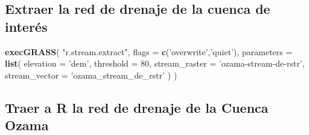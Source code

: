 \documentclass[11pt,]{article}
\newenvironment{Shaded}{\begin{snugshade}}{\end{snugshade}}
\newcommand{\KeywordTok}[1]{\textcolor[rgb]{0.13,0.29,0.53}{\textbf{#1}}}
\newcommand{\DataTypeTok}[1]{\textcolor[rgb]{0.13,0.29,0.53}{#1}}
\newcommand{\DecValTok}[1]{\textcolor[rgb]{0.00,0.00,0.81}{#1}}
\newcommand{\StringTok}[1]{\textcolor[rgb]{0.31,0.60,0.02}{#1}}
\newcommand{\NormalTok}[1]{#1}
\begin{document}
\subsection{Extraer la red de drenaje de la cuenca de
interés}\label{extraer-la-red-de-drenaje-de-la-cuenca-de-interuxe9s}

\begin{Shaded}
\begin{Highlighting}[]
\KeywordTok{execGRASS}\NormalTok{(}
  \StringTok{"r.stream.extract"}\NormalTok{,}
  \DataTypeTok{flags =} \KeywordTok{c}\NormalTok{(}\StringTok{'overwrite'}\NormalTok{,}\StringTok{'quiet'}\NormalTok{),}
  \DataTypeTok{parameters =} \KeywordTok{list}\NormalTok{(}
    \DataTypeTok{elevation =} \StringTok{'dem'}\NormalTok{,}
    \DataTypeTok{threshold =} \DecValTok{80}\NormalTok{,}
    \DataTypeTok{stream_raster =} \StringTok{'ozama-stream-de-rstr'}\NormalTok{,}
    \DataTypeTok{stream_vector =} \StringTok{'ozama_stream_de_rstr'}
\NormalTok{  )}
\NormalTok{)}
\end{Highlighting}
\end{Shaded}

\subsection{Traer a R la red de drenaje de la Cuenca
Ozama}\label{traer-a-r-la-red-de-drenaje-de-la-cuenca-ozama}
\end{document}

